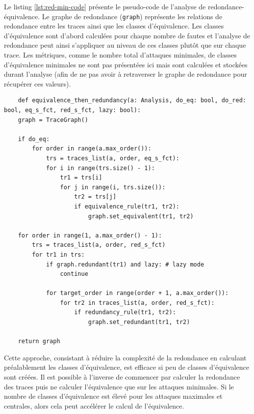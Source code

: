             Le listing \ref{lst:red-min-code} présente le pseudo-code de l'analyse de redondance-équivalence.
            Le graphe de redondance (\texttt{graph}) représente les relations de redondance entre les traces ainsi que les classes d'équivalence.
            Les classes d'équivalence sont d'abord calculées pour chaque nombre de fautes et l'analyse de redondance peut ainsi s'appliquer au niveau de ces classes plutôt que sur chaque trace.
            Les métriques, comme le nombre total d'attaques minimales, de classes d'équivalence minimales ne sont pas présentées ici mais sont calculées et stockées durant l'analyse (afin de ne pas avoir à retraverser le graphe de redondance pour récupérer ces valeurs).
            
    \begin{lstlisting}
    def equivalence_then_redundancy(a: Analysis, do_eq: bool, do_red: bool, eq_s_fct, red_s_fct, lazy: bool):
    graph = TraceGraph()
    
    if do_eq:
        for order in range(a.max_order()):
            trs = traces_list(a, order, eq_s_fct):
            for i in range(trs.size() - 1):
                tr1 = trs[i]
                for j in range(i, trs.size()):
                    tr2 = trs[j]
                    if equivalence_rule(tr1, tr2):
                        graph.set_equivalent(tr1, tr2)
                        
    for order in range(1, a.max_order() - 1): 
        trs = traces_list(a, order, red_s_fct)
        for tr1 in trs:
            if graph.redundant(tr1) and lazy: # lazy mode 
                continue
                
            for target_order in range(order + 1, a.max_order()):
                for tr2 in traces_list(a, order, red_s_fct):
                    if redundancy_rule(tr1, tr2):
                        graph.set_redundant(tr1, tr2)
                
    return graph
    \end{lstlisting}   
            
            Cette approche, consistant à réduire la complexité de la redondance en calculant préalablement les classes d'équivalence, est efficace si peu de classes d'équivalence sont créées.
            Il est possible à l'inverse de commencer par calculer la redondance des traces puis ne calculer l'équivalence que sur les attaques minimales.
            Si le nombre de classes d'équivalence est élevé pour les attaques maximales et centrales, alors cela peut accélérer le calcul de l'équivalence. 
            
